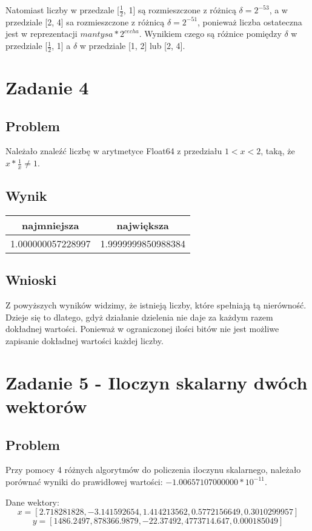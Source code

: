 \documentclass[12pt, a4paper]{article}
\begin{document}
Natomiast liczby w przedzale [$\frac{1}{2}$, 1] są rozmieszczone z różnicą $\delta = 2^{-53}$, a w przedziale [2, 4] sa rozmieszczone z różnicą $\delta = 2^{-51}$, ponieważ liczba ostateczna jest w reprezentacji $mantysa*2^{cecha}$. Wynikiem czego są różnice pomiędzy $\delta$ w przedziale [$\frac{1}{2}$, 1] a $\delta$ w przedziale [1, 2] lub [2, 4].
\section{Zadanie 4}
\subsection{Problem}
Należało znaleźć liczbę w arytmetyce Float64 z przedziału $1 < x < 2$, taką, że $x * \frac{1}{x} \neq 1$.
\subsection{Wynik}
\begin{center}
  \begin{tabular}{c|c}
    najmniejsza & największa\\
    \hline
    1.000000057228997 & 1.9999999850988384
  \end{tabular}
\end{center}
\subsection{Wnioski}
Z powyższych wyników widzimy, że istnieją liczby, które spełniają tą nierówność. Dzieje się to dlatego, gdyż działanie dzielenia nie daje za każdym razem dokładnej wartości. Ponieważ w ograniczonej ilości bitów nie jest możliwe zapisanie dokładnej wartości każdej liczby.

\section{Zadanie 5 - Iloczyn skalarny dwóch wektorów}
\subsection{Problem}
Przy pomocy 4 różnych algorytmów do policzenia iloczynu skalarnego, należało porównać wyniki do prawidłowej wartości: $ -1.00657107000000 * 10^{-11}$.

Dane wektory:
\[x = [2.718281828, -3.141592654, 1.414213562, 0.5772156649, 0.3010299957]\]
\[y = [1486.2497, 878366.9879, -22.37492, 4773714.647, 0.000185049]\]
\end{document}
